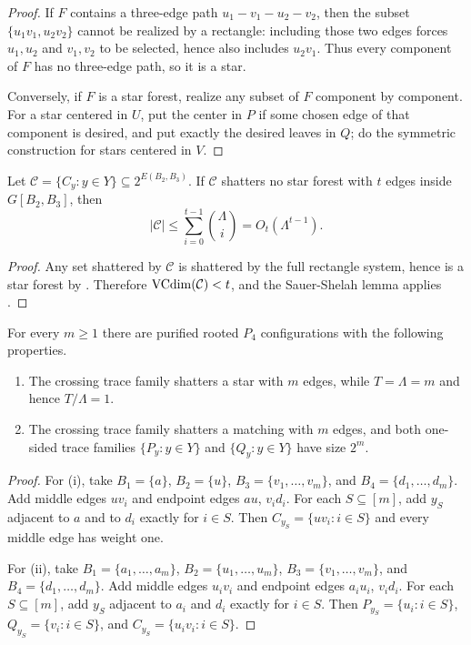 \begin{proof}
If $F$ contains a three-edge path $u_1-v_1-u_2-v_2$, then the subset $\{u_1v_1,u_2v_2\}$ cannot be realized by a rectangle: including those two edges forces $u_1,u_2$ and $v_1,v_2$ to be selected, hence also includes $u_2v_1$. Thus every component of $F$ has no three-edge path, so it is a star.

Conversely, if $F$ is a star forest, realize any subset of $F$ component by component. For a star centered in $U$, put the center in $P$ if some chosen edge of that component is desired, and put exactly the desired leaves in $Q$; do the symmetric construction for stars centered in $V$.
\end{proof}

\begin{corollary}\label{cor:star-compress}
Let $\mathcal C=\{C_y:y\in Y\}\subseteq 2^{E(B_2,B_3)}$. If $\mathcal C$ shatters no star forest with $t$ edges inside $G[B_2,B_3]$, then
\[
  |\mathcal C|\le \sum_{i=0}^{t-1}\binom{\Lambda}{i}=O_t(\Lambda^{t-1}).
\]
\end{corollary}

\begin{proof}
Any set shattered by $\mathcal C$ is shattered by the full rectangle system, hence is a star forest by . Therefore $\operatorname{VCdim}(\mathcal C)<t$, and the Sauer-Shelah lemma applies \cite{Sauer1972,Shelah1972}.
\end{proof}

\begin{proposition}\label{prop:boolean-obstructions}
For every $m\ge 1$ there are purified rooted $P_4$ configurations with the following properties.
\begin{enumerate}[label=(\roman*)]
\item The crossing trace family shatters a star with $m$ edges, while $T=\Lambda=m$ and hence $T/\Lambda=1$.
\item The crossing trace family shatters a matching with $m$ edges, and both one-sided trace families $\{P_y:y\in Y\}$ and $\{Q_y:y\in Y\}$ have size $2^m$.
\end{enumerate}
\end{proposition}

\begin{proof}
For (i), take $B_1=\{a\}$, $B_2=\{u\}$, $B_3=\{v_1,\dots,v_m\}$, and $B_4=\{d_1,\dots,d_m\}$. Add middle edges $uv_i$ and endpoint edges $au$, $v_i d_i$. For each $S\subseteq[m]$, add $y_S$ adjacent to $a$ and to $d_i$ exactly for $i\in S$. Then $C_{y_S}=\{uv_i:i\in S\}$ and every middle edge has weight one.

For (ii), take $B_1=\{a_1,\dots,a_m\}$, $B_2=\{u_1,\dots,u_m\}$, $B_3=\{v_1,\dots,v_m\}$, and $B_4=\{d_1,\dots,d_m\}$. Add middle edges $u_iv_i$ and endpoint edges $a_iu_i$, $v_id_i$. For each $S\subseteq[m]$, add $y_S$ adjacent to $a_i$ and $d_i$ exactly for $i\in S$. Then $P_{y_S}=\{u_i:i\in S\}$, $Q_{y_S}=\{v_i:i\in S\}$, and $C_{y_S}=\{u_iv_i:i\in S\}$.
\end{proof}

